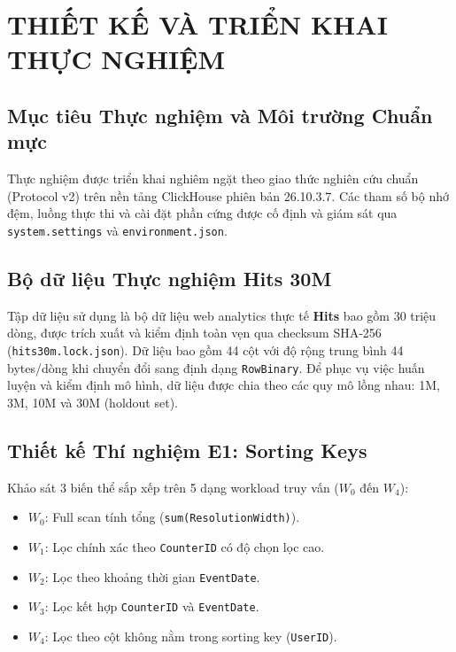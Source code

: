 \section{THIẾT KẾ VÀ TRIỂN KHAI THỰC NGHIỆM}
\label{sec:thiet_ke_thuc_nghiem}


\subsection{Mục tiêu Thực nghiệm và Môi trường Chuẩn mực}
Thực nghiệm được triển khai nghiêm ngặt theo giao thức nghiên cứu chuẩn (Protocol v2) trên nền tảng ClickHouse phiên bản 26.10.3.7. Các tham số bộ nhớ đệm, luồng thực thi và cài đặt phần cứng được cố định và giám sát qua \texttt{system.settings} và \texttt{environment.json}.

\subsection{Bộ dữ liệu Thực nghiệm Hits 30M}
Tập dữ liệu sử dụng là bộ dữ liệu web analytics thực tế \textbf{Hits} bao gồm 30 triệu dòng, được trích xuất và kiểm định toàn vẹn qua checksum SHA-256 (\texttt{hits30m.lock.json}). Dữ liệu bao gồm 44 cột với độ rộng trung bình 44 bytes/dòng khi chuyển đổi sang định dạng \texttt{RowBinary}.
Để phục vụ việc huấn luyện và kiểm định mô hình, dữ liệu được chia theo các quy mô lồng nhau: 1M, 3M, 10M và 30M (holdout set).

\subsection{Thiết kế Thí nghiệm E1: Sorting Keys}
Khảo sát 3 biến thể sắp xếp trên 5 dạng workload truy vấn ($W_0$ đến $W_4$):
\begin{itemize}
    \item $W_0$: Full scan tính tổng (\texttt{sum(ResolutionWidth)}).
    \item $W_1$: Lọc chính xác theo \texttt{CounterID} có độ chọn lọc cao.
    \item $W_2$: Lọc theo khoảng thời gian \texttt{EventDate}.
    \item $W_3$: Lọc kết hợp \texttt{CounterID} và \texttt{EventDate}.
    \item $W_4$: Lọc theo cột không nằm trong sorting key (\texttt{UserID}).
\end{itemize}

